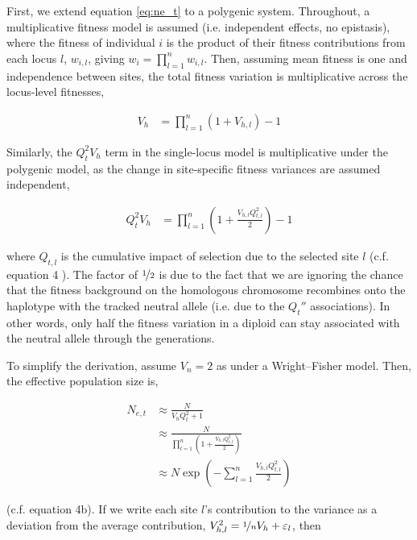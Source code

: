 \documentclass[11pt]{article}
\newcommand{\E}{\mathbb{E}}
\newcommand{\V}{\text{V}}
\begin{document}
First, we extend equation \eqref{eq:ne_t} to a polygenic system. Throughout, a
multiplicative fitness model is assumed (i.e. independent effects, no
epistasis), where the fitness of individual $i$ is the product of their fitness
contributions from each locus $l$, $w_{i,l}$, giving $w_i = \prod_{l=1}^n
w_{i,l}$. Then, assuming mean fitness is one and independence between sites,
the total fitness variation is multiplicative across the locus-level fitnesses,

\begin{align}
  V_h %
      &= \prod_{l=1}^n (1 + V_{h,l})  - 1
\end{align}

Similarly, the $Q_t^2 V_h$ term in the single-locus model is multiplicative
under the polygenic model, as the change in site-specific fitness variances are
assumed independent,

\begin{align}
  Q_t^2 V_h &= \prod_{l=1}^n \left(1 + \frac{V_{h,l} Q_{t,l}^2}{2}\right)  - 1
\end{align}

where $Q_{t,l}$ is the cumulative impact of selection due to the selected site
$l$ (c.f. equation 4 \cite{Santiago1998-bs}). The factor of $\nicefrac{1}{2}$
is due to the fact that we are ignoring the chance that the fitness background
on the homologous chromosome recombines onto the haplotype with the tracked
neutral allele (i.e. due to the $Q_t''$ associations). In other words, only
half the fitness variation in a diploid can stay associated with the neutral
allele through the generations.

To simplify the derivation, assume $V_n = 2$ as under a Wright--Fisher model.
Then, the effective population size is,

\begin{align}
  N_{e,t} &\approx \frac{N}{V_h Q_t^2 + 1} \\
          &\approx \frac{N}{\prod_{l=1}^n \left(1 + \frac{V_{h,l} Q_{t,l}^2}{2}\right)} \\
          &\approx N \exp\left(- \sum_{l=1}^n \frac{V_{h,l} Q_{t,l}^2}{2}\right)
\end{align}

(c.f. \cite{Santiago1998-bs} equation 4b). If we write each site $l$'s
contribution to the variance as a deviation from the average contribution,
$V_{h,l}^2 = \nicefrac{1}{n} V_h + \varepsilon_l$, then 
\end{document}
